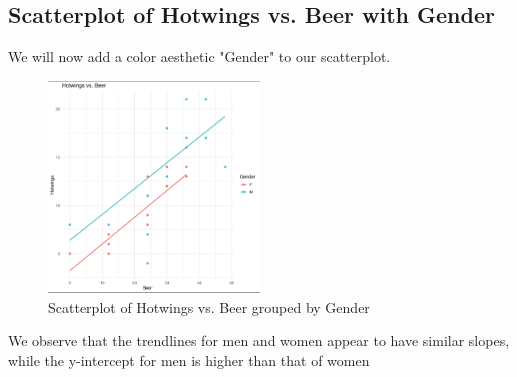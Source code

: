 \documentclass{article}
\theoremstyle{mytheoremstyle}
\theoremstyle{mytheoremstyle}
\theoremstyle{myproblemstyle}
\begin{document}
      \subsection{Scatterplot of Hotwings vs. Beer with Gender}
      We will now add a color aesthetic "Gender" to our scatterplot.
      \vspace{0.1in}
      \begin{figure}[h]
        \begin{center}
          \includegraphics[width=0.5\textwidth]{hotwings_vs_beer_with_gender.png}
        \end{center}
        \caption{Scatterplot of Hotwings vs. Beer grouped by Gender}\label{fig:}
      \end{figure}
      \vspace{0.1in}
      We observe that the trendlines for men and women appear to have similar slopes, while the y-intercept for men is higher than that of women
      
\end{document}
